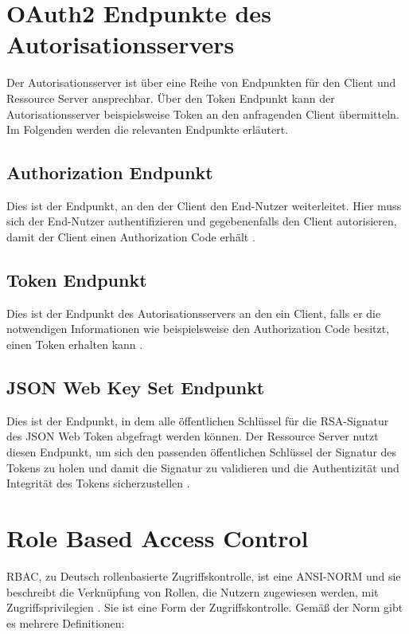 \section{OAuth2 Endpunkte des Autorisationsservers}
\label{sec:OAuth2EndpunktedesAutorisationsservers}

Der Autorisationsserver ist über eine Reihe von Endpunkten für den Client und Ressource Server ansprechbar. Über den Token 
Endpunkt kann der Autorisationsserver beispielsweise Token an den anfragenden Client 
übermitteln. Im Folgenden werden die relevanten Endpunkte erläutert.

\subsection{Authorization Endpunkt}
\label{sec:OAuth2EndpunktedesAutorisationsservers:AuthorizationEndpunkt}
Dies ist der Endpunkt, an den der Client den End-Nutzer weiterleitet. Hier muss sich der 
End-Nutzer authentifizieren und gegebenenfalls den Client autorisieren, damit der Client einen Authorization Code erhält \citep{oauth2:2012}.

\subsection{Token Endpunkt}
\label{sec:OAuth2EndpunktedesAutorisationsservers:TokenEndpunkt}
Dies ist der Endpunkt des Autorisationsservers an den ein Client, falls er die notwendigen 
Informationen wie beispielsweise den Authorization Code besitzt, einen Token erhalten 
kann \citep{oauth2:2012}.

\subsection{JSON Web Key Set Endpunkt}
\label{sec:OAuth2EndpunktedesAutorisationsservers:JSONWebKeySet(JWKS)Endpunkt}
Dies ist der Endpunkt, in dem alle öffentlichen Schlüssel für die \ac{RSA}-Signatur des JSON Web 
Token abgefragt werden können. Der Ressource Server nutzt diesen Endpunkt, um sich 
den passenden öffentlichen Schlüssel der Signatur des Tokens zu holen und damit die 
Signatur zu validieren und die Authentizität und Integrität des Tokens sicherzustellen \citep{jwk:2015}.

\section{Role Based Access Control}
\label{sec:Zugriffskontrolle:RoleBasedAccessControl(RBAC)}
\ac{RBAC}, zu Deutsch rollenbasierte Zugriffskontrolle, ist eine ANSI-NORM 
und sie beschreibt die Verknüpfung von Rollen, die Nutzern zugewiesen werden, mit 
Zugriffsprivilegien \citep{rbac:2006}. Sie ist eine Form der Zugriffskontrolle. Gemäß der Norm gibt es mehrere Definitionen:

